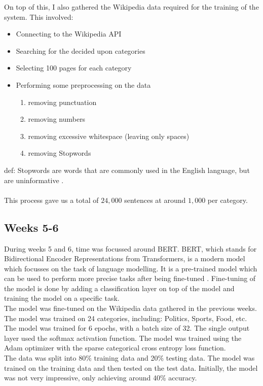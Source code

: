 On top of this, I also gathered the Wikipedia data required for the training of the system. This involved:
\begin{itemize}
    \item Connecting to the Wikipedia API
    \item Searching for the decided upon categories
    \item Selecting 100 pages for each category
    \item Performing some preprocessing on the data
    \begin{enumerate}
        \item removing punctuation
        \item removing numbers
        \item removing excessive whitespace (leaving only spaces)
        \item removing Stopwords
    \end{enumerate}
\end{itemize}
def: Stopwords are words that are commonly used in the English language, but are uninformative \cite{sarica2021stopwords}.\\\\

This process gave us a total of $24,000$ sentences at around $1,000$ per category.


\subsection{Weeks 5-6}
During weeks 5 and 6, time was focussed around BERT. BERT, which stands for Bidirectional Encoder Representations from Transformers,
is a modern model which focusses on the task of language modelling. It is a pre-trained model which can be used to perform more precise
tasks after being fine-tuned \cite{devlin_bert_2019}. Fine-tuning of the model is done by adding a classification layer on top of the
model and training the model on a specific task.\\

The model was fine-tuned on the Wikipedia data gathered in the previous weeks. The model was trained on 24 categories, including:
Politics, Sports, Food, etc. The model was trained for 6 epochs, with a batch size of 32. The single output layer used the
softmax activation function. The model was trained using the Adam optimizer with the sparse categorical cross entropy loss function.\\

The data was split into 80\% training data and 20\% testing data. The model was trained on the training data and then tested on the
test data. Initially, the model was not very impressive, only achieving around 40\% accuracy.

